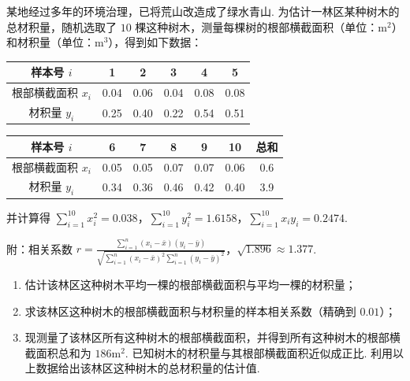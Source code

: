 \begin{problem}
某地经过多年的环境治理，已将荒山改造成了绿水青山. 为估计一林区某种树木的总材积量，随机选取了 \(10\) 棵这种树木，测量每棵树的根部横截面积（单位：\( \mathrm{m}^2 \)）和材积量（单位：\( \mathrm{m}^3 \)），得到如下数据：

\begin{center}
\renewcommand{\arraystretch}{1.3}
\begin{tabular}{|c|c|c|c|c|c|}
\hline
样本号 \(i\) & 1 & 2 & 3 & 4 & 5 \\
\hline
根部横截面积 \(x_i\) & 0.04 & 0.06 & 0.04 & 0.08 & 0.08 \\
\hline
材积量 \(y_i\) & 0.25 & 0.40 & 0.22 & 0.54 & 0.51 \\
\hline
\end{tabular}
\end{center}

\begin{center}
\renewcommand{\arraystretch}{1.3}
\begin{tabular}{|c|c|c|c|c|c|c|}
\hline
样本号 \(i\) & 6 & 7 & 8 & 9 & 10 & 总和 \\
\hline
根部横截面积 \(x_i\) & 0.05 & 0.05 & 0.07 & 0.07 & 0.06 & 0.6 \\
\hline
材积量 \(y_i\) & 0.34 & 0.36 & 0.46 & 0.42 & 0.40 & 3.9 \\
\hline
\end{tabular}
\end{center}

并计算得 \( \sum_{i=1}^{10}x_i^2=0.038 \)，\( \sum_{i=1}^{10}y_i^2=1.6158 \)，\( \sum_{i=1}^{10}x_iy_i=0.2474 \).

附：相关系数 \( r=\frac{\sum_{i=1}^{n}\left( x_i-\bar{x} \right)\left( y_i-\bar{y} \right)}{\sqrt{\sum_{i=1}^{n}\left( x_i-\bar{x} \right)^2\sum_{i=1}^{n}\left( y_i-\bar{y} \right)^2}} \)，\( \sqrt{1.896}\approx1.377 \).

\begin{enumerate}
\item 估计该林区这种树木平均一棵的根部横截面积与平均一棵的材积量；
\item 求该林区这种树木的根部横截面积与材积量的样本相关系数（精确到 \(0.01\)）；
\item 现测量了该林区所有这种树木的根部横截面积，并得到所有这种树木的根部横截面积总和为 \(186\mathrm{m}^2\). 已知树木的材积量与其根部横截面积近似成正比. 利用以上数据给出该林区这种树木的总材积量的估计值.
\end{enumerate}
\end{problem}

